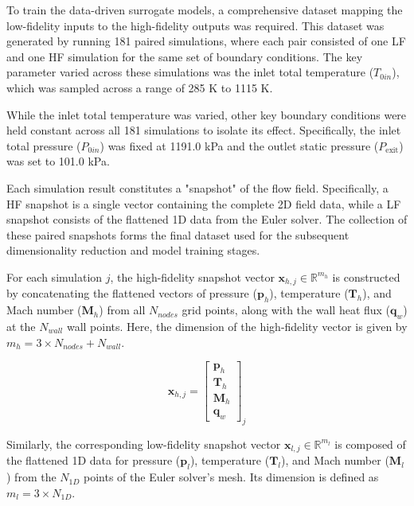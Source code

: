\documentclass[tg, EN]{ufabcFHZh_tg}
\begin{document}
To train the data-driven surrogate models, a comprehensive dataset mapping the low-fidelity inputs to the high-fidelity outputs was required. This dataset was generated by running 181 paired simulations, where each pair consisted of one LF and one HF simulation for the same set of boundary conditions. The key parameter varied across these simulations was the inlet total temperature ($T_{0in}$), which was sampled across a range of 285 K to 1115 K.

While the inlet total temperature was varied, other key boundary conditions were held constant across all 181 simulations to isolate its effect. Specifically, the inlet total pressure ($P_{0in}$) was fixed at 1191.0 kPa and the outlet static pressure ($P_{\text{exit}}$) was set to 101.0 kPa.

Each simulation result constitutes a "snapshot" of the flow field. Specifically, a HF snapshot is a single vector containing the complete 2D field data, while a LF snapshot consists of the flattened 1D data from the Euler solver. The collection of these paired snapshots forms the final dataset used for the subsequent dimensionality reduction and model training stages.

For each simulation $j$, the high-fidelity snapshot vector $\mathbf{x}_{h,j} \in \mathbb{R}^{m_h}$ is constructed by concatenating the flattened vectors of pressure ($\mathbf{p}_h$), temperature ($\mathbf{T}_h$), and Mach number ($\mathbf{M}_h$) from all $N_{nodes}$ grid points, along with the wall heat flux ($\mathbf{q}_w$) at the $N_{wall}$ wall points. Here, the dimension of the high-fidelity vector is given by$m_h = 3 \times N_{nodes} + N_{wall}$.

\begin{equation}
    \mathbf{x}_{h,j} = 
    \begin{bmatrix}
        \mathbf{p}_h \\
        \mathbf{T}_h \\
        \mathbf{M}_h \\
        \mathbf{q}_w
    \end{bmatrix}_j
\end{equation}

Similarly, the corresponding low-fidelity snapshot vector $\mathbf{x}_{l,j} \in \mathbb{R}^{m_l}$ is composed of the flattened 1D data for pressure ($\mathbf{p}_l$), temperature ($\mathbf{T}_l$), and Mach number ($\mathbf{M}_l$) from the $N_{1D}$ points of the Euler solver's mesh. Its dimension is defined as
$m_l = 3 \times N_{1D}$.
\end{document}
